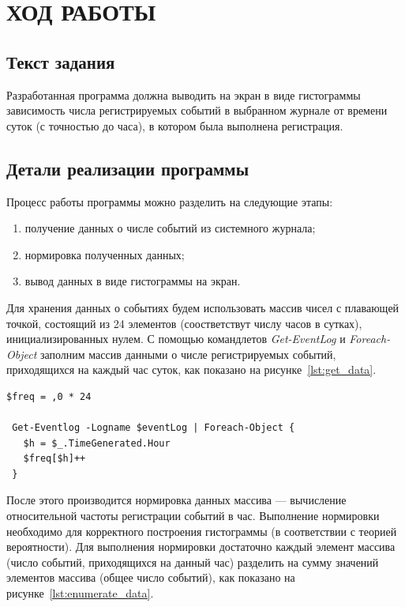 \section{ХОД РАБОТЫ}

\subsection{Текст задания}

Разработанная программа должна выводить на экран в виде гистограммы зависимость
числа регистрируемых событий в выбранном журнале от времени суток (с точностью до часа),
в котором была выполнена регистрация.

\subsection{Детали реализации программы}

Процесс работы программы можно разделить на следующие этапы:

\begin{enumerate}
\item получение данных о числе событий из системного журнала;
\item нормировка полученных данных;
\item вывод данных в виде гистограммы на экран.
\end{enumerate}

Для хранения данных о событиях будем использовать массив чисел с плавающей точкой,
состоящий из 24 элементов (соостветствут числу часов в сутках),
инициализированных нулем.
С помощью командлетов \textit{Get-EventLog} и \textit{Foreach-Object} заполним
массив данными о числе 
регистрируемых событий, приходящихся на каждый час суток, как показано 
на рисунке~\ref{lst:get_data}.

\begin{lstlisting}[caption=Получение данных о числе событий,label=lst:get_data]
 $freq = ,0 * 24
 
 Get-Eventlog -Logname $eventLog | Foreach-Object {
   $h = $_.TimeGenerated.Hour
   $freq[$h]++
 }
\end{lstlisting}

После этого производится нормировка данных массива --- вычисление относительной 
частоты регистрации событий в час.
Выполнение нормировки необходимо для корректного построения гистограммы 
(в соответствии с теорией вероятности).
Для выполнения нормировки достаточно каждый элемент массива (число событий,
приходящихся на данный час) разделить на сумму значений элементов 
массива (общее число событий), как показано на рисунке~\ref{lst:enumerate_data}.

